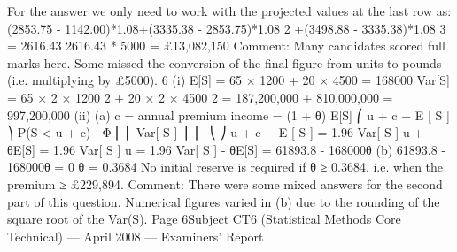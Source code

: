 For the answer we only need to work with the projected values at the last row as:
(2853.75 - 1142.00)*1.08+(3335.38 - 2853.75)*1.08 2 +(3498.88 - 3335.38)*1.08 3
= 2616.43
2616.43 * 5000 = £13,082,150
Comment: Many candidates scored full marks here. Some missed the conversion of
the final figure from units to pounds (i.e. multiplying by £5000).
6
(i)
E[S]
= 65 × 1200 + 20 × 4500 = 168000
Var[S] = 65 × 2 × 1200 2 + 20 × 2 × 4500 2
= 187,200,000 + 810,000,000
= 997,200,000
(ii)
(a)
c = annual premium income = (1 + θ) E[S]
⎛ u + c − E [ S ] ⎞
P(S < u + c)  Φ ⎜
⎜ Var[ S ] ⎟ ⎟

⎝
⎠
u + c − E [ S ]
= 1.96
Var[ S ]
u + θE[S] = 1.96 Var[ S ]
u = 1.96 Var[ S ] - θE[S]
= 61893.8 - 168000θ
(b)
61893.8 - 168000θ = 0
θ = 0.3684
No initial reserve is required if θ ≥ 0.3684. i.e. when the premium ≥
£229,894.
Comment: There were some mixed answers for the second part of this question.
Numerical figures varied in (b) due to the rounding of the square root of the
Var(S).
Page 6Subject CT6 (Statistical Methods Core Technical) — April 2008 — Examiners’ Report
